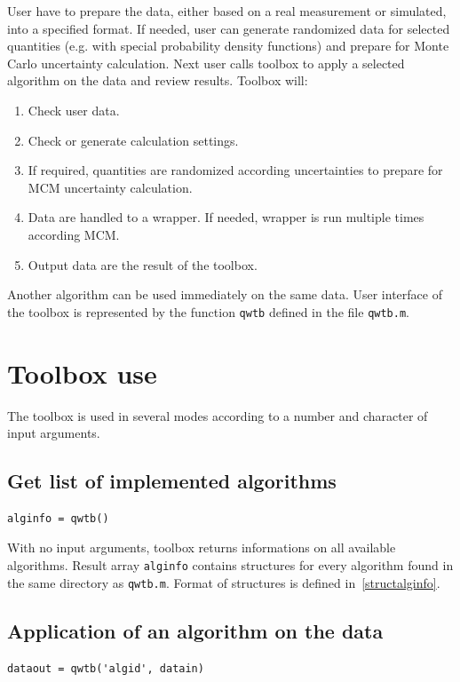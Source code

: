 \documentclass[12pt,a4paper,oneside]{report} %
\begin{document}
User have to prepare the data, either based on a real measurement or simulated, into a specified
format. If needed, user can generate randomized data for selected quantities (e.g. with special
probability density functions) and prepare for Monte Carlo uncertainty calculation. Next user calls
toolbox to apply a selected algorithm on the data and review results. Toolbox will:
\begin{enumerate}
        \item Check user data.
        \item Check or generate calculation settings.
        \item If required, quantities are randomized according uncertainties to prepare for MCM uncertainty calculation.
        \item Data are handled to a wrapper. If needed, wrapper is run multiple times according MCM.
        \item Output data are the result of the toolbox.
\end{enumerate}

Another algorithm can be used immediately on the same data. User interface of the toolbox is represented
by the function \lstinline{qwtb} defined in the file {\tt qwtb.m}.

\section{Toolbox use} %
The toolbox is used in several modes according to a number and character of input arguments.

\subsection{Get list of implemented algorithms} %
\begin{lstlisting}
alginfo = qwtb()
\end{lstlisting}

With no input arguments, toolbox returns informations on all available algorithms. Result array
\lstinline{alginfo} contains structures for every algorithm found in the same directory as
\texttt{qwtb.m}. Format of structures is defined in~\ref{structalginfo}.

\subsection{Application of an algorithm on the data} %
\begin{lstlisting}
dataout = qwtb('algid', datain)
\end{lstlisting}
\end{document}
